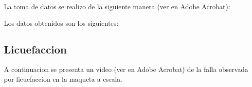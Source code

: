 La toma de datos se realizo de la siguiente manera (ver en Adobe Acrobat):

\begin{center}
\end{center}



Los datos obtenidos son los siguientes:


\subsection{Licuefaccion}

A continuacion se presenta un video (ver en Adobe Acrobat) de la falla observada por licuefaccion en la maqueta a escala.

